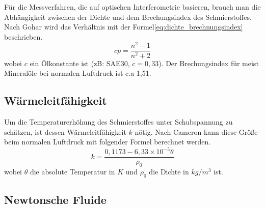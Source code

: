 Für die Messverfahren, die auf optischen Interferometrie basieren, brauch man die Abhängigkeit zwischen der Dichte und dem Brechungsindex des Schmierstoffes.
Nach Gohar wird das Verhältnis mit der Formel\ref{eq:dichte_brechnungsindex} beschrieben.
\begin{equation}
    \label{eq:dichte_brechnungsindex}
    c  p = \frac{n^2 - 1}{n^2 + 2}
\end{equation}
%
wobei $c$ ein Ölkonstante ist (zB: SAE30, $c = 0,33$).
Der Brechungsindex für meist Mineralöle bei normalen Luftdruck ist c.a 1,51.


\subsection*{Wärmeleitfähigkeit}
\label{waermeleitfaehigkeit}

Um die Temperaturerhöhung des Schmierstoffes unter Schubspannung zu schätzen, ist dessen Wärmeleitfähigkeit $k$ nötig.
Nach Cameron\cite{cameron} kann diese Größe beim normalen Luftdruck mit folgender Formel berechnet werden.
\begin{equation}
    \label{eq:waermeleitfaehigkeit}
    k = \frac{0,1173 - 6,33 \times 10^{-5}  \theta}{\rho_0}
\end{equation}
%
wobei $\theta$ die absolute Temperatur in $K$ und $\rho_0$ die Dichte in $kg/m^3$ ist.

\subsection*{Newtonsche Fluide}
\label{sub:newtonsche_fluide}

